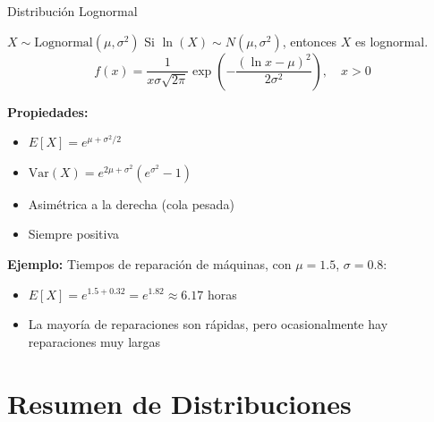 \documentclass[aspectratio=1610, 9pt]{beamer}
\begin{document}
\begin{frame}{Distribuci\'{o}n Lognormal}

\begin{block}{$X \sim \text{Lognormal}(\mu, \sigma^2)$}
Si $\ln(X) \sim N(\mu, \sigma^2)$, entonces $X$ es lognormal.
\[
f(x) = \frac{1}{x\sigma\sqrt{2\pi}}\exp\!\left(-\frac{(\ln x - \mu)^2}{2\sigma^2}\right), \quad x > 0
\]
\end{block}

\vspace{0.2cm}
\textbf{Propiedades:}
\begin{itemize}
    \item $E[X] = e^{\mu + \sigma^2/2}$
    \item $\text{Var}(X) = e^{2\mu+\sigma^2}(e^{\sigma^2}-1)$
    \item Asim\'{e}trica a la derecha (cola pesada)
    \item Siempre positiva
\end{itemize}

\vspace{0.3cm}
\textbf{Ejemplo:} Tiempos de reparaci\'{o}n de m\'{a}quinas, con $\mu = 1.5$, $\sigma = 0.8$:
\begin{itemize}
    \item $E[X] = e^{1.5 + 0.32} = e^{1.82} \approx 6.17$ horas
    \item La mayor\'{i}a de reparaciones son r\'{a}pidas, pero ocasionalmente hay reparaciones muy largas
\end{itemize}
\end{frame}

\section{Resumen de Distribuciones}
\end{document}
